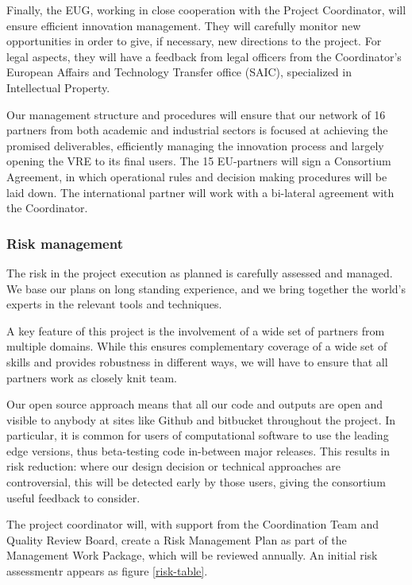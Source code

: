 Finally, the EUG, working in close cooperation with the
Project Coordinator, will ensure efficient innovation
management. They will carefully monitor new opportunities in
order to give, if necessary, new directions to the project. For
legal aspects, they will have a feedback from legal officers from the
Coordinator’s European Affairs and Technology Transfer office (SAIC),
specialized in Intellectual Property.

Our management structure and procedures will ensure that our network
of 16 partners from both academic and industrial sectors is focused at
achieving the promised deliverables, efficiently managing the
innovation process and largely opening the VRE to its final users. The
15 EU-partners will sign a Consortium Agreement, in which operational
rules and decision making procedures will be laid down. The
international partner will work with a bi-lateral agreement with the
Coordinator.

\subsubsection{Risk management}\label{sec:risks}

The risk in the project execution as planned is carefully assessed and
managed. We base our plans on long standing experience, and we bring
together the world's experts in the relevant tools and techniques.

A key feature of this project is the involvement of a wide set of
partners from multiple domains. While this ensures complementary
coverage of a wide set of skills and provides robustness in different
ways, we will have to ensure that all partners work as closely knit
team. 

Our open source approach means that all our code and outputs
are open and visible to anybody at sites like Github and bitbucket
throughout the project. In particular, it is common for users of
computational software to use the leading edge versions, thus
beta-testing code in-between major releases. This results in risk
reduction: where our design decision or technical approaches are
controversial, this will be detected early by those users, giving the
consortium useful feedback to consider.

The project coordinator will, with support from the Coordination Team
and Quality Review Board, create a Risk Management Plan
 as part of the Management Work Package,
which will be reviewed annually. An initial risk assessmentr appears
as figure \ref{risk-table}.

